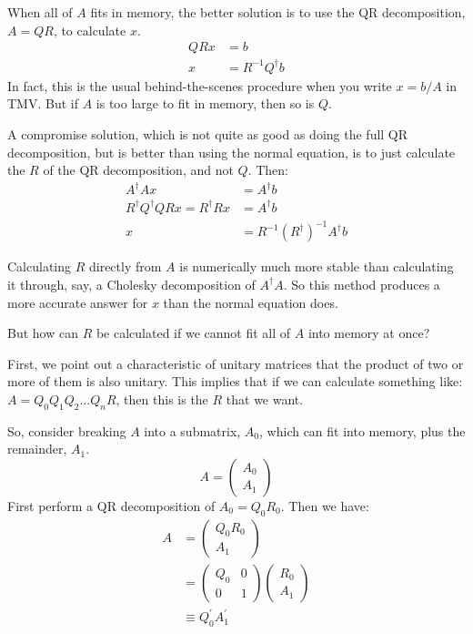 \documentclass[twoside,letterpaper,11pt]{article}
\begin{document}
When all of $A$ fits in memory, the better solution is to use the QR decomposition, $A = QR$,
to calculate $x$.
\begin{align*}
Q R x &= b \\
x &= R^{-1} Q^\dagger b
\end{align*}
In fact, this is the usual behind-the-scenes procedure when you write $x = b/A$ in TMV.
But if $A$ is too large to fit in memory, then so is $Q$.

A compromise solution, which is not quite as good as doing the full QR decomposition,
but is better than using the normal equation, is to just calculate the $R$ of the
QR decomposition, and not $Q$.  Then:
\begin{align*}
A^\dagger A x &= A^\dagger b \\
R^\dagger Q^\dagger Q R x = R^\dagger R x &= A^\dagger b \\
x &= R^{-1} (R^\dagger)^{-1} A^\dagger b
\end{align*}

Calculating $R$ directly from $A$ is numerically much more stable than 
calculating it through, say, a Cholesky decomposition of $A^\dagger A$.
So this method produces a more accurate answer for $x$ than the normal equation does.

But how can $R$ be calculated if we cannot fit all of $A$ into memory at once?

First, we point out a characteristic of unitary matrices that the product 
of two or more of them is also unitary.  
This implies that if we can calculate
something like: $A = Q_0 Q_1 Q_2 ... Q_n R$, then this is the $R$ that we want.

So, consider breaking $A$ into a submatrix, $A_0$, which can fit into memory, 
plus the remainder, $A_1$.
\begin{equation*}
A = \left(\begin{array}{c}A_0 \\A_1\end{array}\right)
\end{equation*}
First perform a QR decomposition of $A_0 = Q_0 R_0$.  Then we have:
\begin{align*}
A &= \left(\begin{array}{c}Q_0 R_0 \\ A_1 \end{array}\right) \\
&= \left(\begin{array}{cc}Q_0 & 0 \\ 0 & 1\end{array}\right) 
      \left(\begin{array}{c}R_0 \\ A_1 \end{array}\right) \\
&\equiv Q_0^\prime A_1^\prime
\end{align*}
\end{document}
